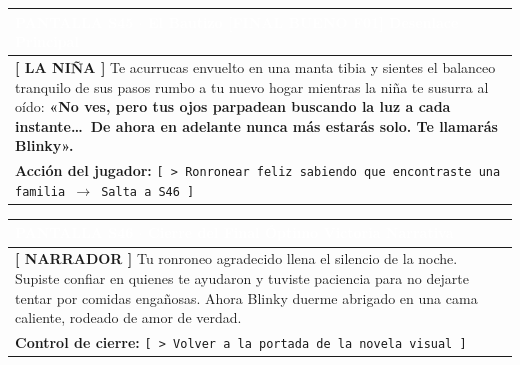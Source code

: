 \documentclass[11pt, a4paper]{article}
\begin{document}
\noindent
\begin{tabularx}{\textwidth}{|X|}
\hline
\rowcolor{colorExito}
\textbf{\textcolor{white}{PANTALLA S45 $\cdot$ El Bautizo [FINAL BUENO F01]}} \hfill \small\textcolor{white}{Desenlace Principal} \\ \hline
\rowcolor{colorTextoBox}
\textbf{\textcolor{colorEmisor}{[ LA NIÑA ]}} \vspace{0.2em}\newline
Te acurrucas envuelto en una manta tibia y sientes el balanceo tranquilo de sus pasos rumbo a tu nuevo hogar mientras la niña te susurra al oído: \newline
\textbf{«No ves, pero tus ojos parpadean buscando la luz a cada instante\ldots\ De ahora en adelante nunca más estarás solo. Te llamarás Blinky».} \\ \hline
\rowcolor{colorBotonBox}
\textbf{Acción del jugador:} \newline
\texttt{[ > Ronronear feliz sabiendo que encontraste una familia $\rightarrow$ Salta a S46 ]} \\ \hline
\end{tabularx}

\vspace{1em}

\noindent
\begin{tabularx}{\textwidth}{|X|}
\hline
\rowcolor{colorExito}
\textbf{\textcolor{white}{PANTALLA S46 $\cdot$ Cierre del Final Óptimo}} \hfill \small\textcolor{white}{Victoria Narrativa} \\ \hline
\rowcolor{colorTextoBox}
\textbf{\textcolor{colorExito}{[ NARRADOR ]}} \vspace{0.2em}\newline
Tu ronroneo agradecido llena el silencio de la noche. Supiste confiar en quienes te ayudaron y tuviste paciencia para no dejarte tentar por comidas engañosas. Ahora Blinky duerme abrigado en una cama caliente, rodeado de amor de verdad. \\ \hline
\rowcolor{colorBotonBox}
\textbf{Control de cierre:} \newline
\texttt{[ > Volver a la portada de la novela visual ]} \\ \hline
\end{tabularx}

\newpage

\end{document}

